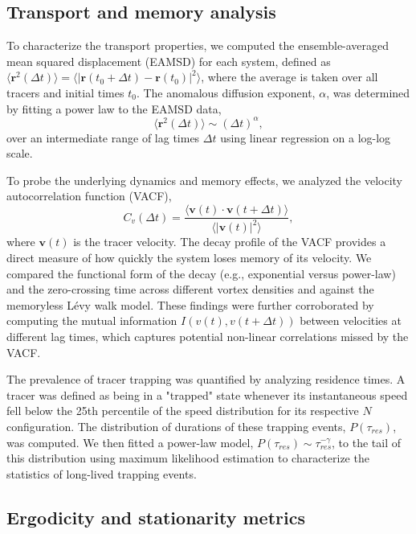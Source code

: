 \documentclass[]{article}
\begin{document}
\subsection{Transport and memory analysis}

To characterize the transport properties, we computed the ensemble-averaged mean squared displacement (EAMSD) for each system, defined as $\langle \mathbf{r}^2(\Delta t) \rangle = \langle |\mathbf{r}(t_0 + \Delta t) - \mathbf{r}(t_0)|^2 \rangle$, where the average is taken over all tracers and initial times $t_0$. The anomalous diffusion exponent, $\alpha$, was determined by fitting a power law to the EAMSD data,
\begin{equation}
\langle \mathbf{r}^2(\Delta t) \rangle \sim (\Delta t)^\alpha,
\end{equation}
over an intermediate range of lag times $\Delta t$ using linear regression on a log-log scale.

To probe the underlying dynamics and memory effects, we analyzed the velocity autocorrelation function (VACF),
\begin{equation}
C_v(\Delta t) = \frac{\langle \mathbf{v}(t) \cdot \mathbf{v}(t + \Delta t) \rangle}{\langle |\mathbf{v}(t)|^2 \rangle},
\end{equation}
where $\mathbf{v}(t)$ is the tracer velocity. The decay profile of the VACF provides a direct measure of how quickly the system loses memory of its velocity. We compared the functional form of the decay (e.g., exponential versus power-law) and the zero-crossing time across different vortex densities and against the memoryless L\'evy walk model. These findings were further corroborated by computing the mutual information $I(v(t), v(t+\Delta t))$ between velocities at different lag times, which captures potential non-linear correlations missed by the VACF.

The prevalence of tracer trapping was quantified by analyzing residence times. A tracer was defined as being in a "trapped" state whenever its instantaneous speed fell below the 25th percentile of the speed distribution for its respective $N$ configuration. The distribution of durations of these trapping events, $P(\tau_{res})$, was computed. We then fitted a power-law model, $P(\tau_{res}) \sim \tau_{res}^{-\gamma}$, to the tail of this distribution using maximum likelihood estimation to characterize the statistics of long-lived trapping events.

\subsection{Ergodicity and stationarity metrics}
\end{document}
